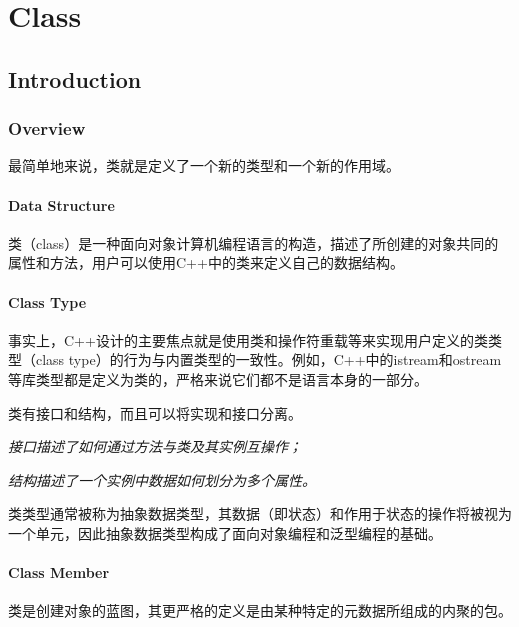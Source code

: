 \part{Class}

\chapter{Introduction}




\section{Overview}

最简单地来说，类就是定义了一个新的类型和一个新的作用域。


\subsection{Data Structure}


类（class）是一种面向对象计算机编程语言的构造，描述了所创建的对象共同的属性和方法，用户可以使用C++中的类来定义自己的数据结构。

\subsection{Class Type}


事实上，C++设计的主要焦点就是使用类和操作符重载等来实现用户定义的类类型（class type）的行为与内置类型的一致性。例如，C++中的istream和ostream等库类型都是定义为类的，严格来说它们都不是语言本身的一部分。


类有接口和结构，而且可以将实现和接口分离。



\begin{compactitem}
\item \textsl{接口描述了如何通过方法与类及其实例互操作；}
\item \textsl{结构描述了一个实例中数据如何划分为多个属性。}
\end{compactitem}

类类型通常被称为抽象数据类型，其数据（即状态）和作用于状态的操作将被视为一个单元，因此抽象数据类型构成了面向对象编程和泛型编程的基础。



\subsection{Class Member}


类是创建对象的蓝图，其更严格的定义是由某种特定的元数据所组成的内聚的包。


